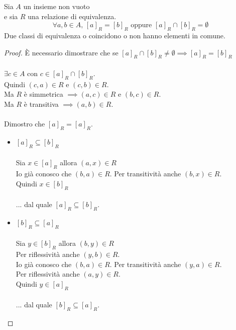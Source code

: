 \documentclass[a4paper,12pt, oneside]{book}
\begin{document}
\begin{teorema}
	Sia $A$ un insieme non vuoto\\
	e sia $R$ una relazione di equivalenza.
	$$\forall a,b \in A \mbox{, } [a]_{R} = [b]_{R} \mbox{ oppure } [a]_{R} \cap [b]_{R} = \emptyset$$
	Due classi  di equivalenza o coincidono o non hanno elementi in comune.
	\begin{proof}
		È necessario dimostrare che se $[a]_{R} \cap [b]_{R} \not = \emptyset \implies [a]_{R} = [b]_{R}$\\\\

		$\exists c \in A$ con $c \in [a]_{R} \cap [b]_{R}$.\\
		Quindi $(c,a) \in R$ e $(c,b) \in R$.\\
		Ma $R$ è simmetrica $\implies (a,c) \in R$ e $(b,c) \in R$.\\
		Ma $R$ è transitiva $\implies (a,b) \in R$.\\\\

		Dimostro che $[a]_{R} = [a]_{R}$.\\
		\begin{itemize}
			\item $[a]_{R} \subseteq [b]_{R}$\\\\
			      Sia $x \in [a]_{R}$ allora $(a,x) \in R$\\
			      Io già conosco che $(b,a) \in R$. Per transitività anche $(b,x) \in R$.\\
			      Quindi $x \in [b]_{R}$\\\\
			      ... dal quale $[a]_{R} \subseteq [b]_{R}$.
			\item $[b]_{R} \subseteq [a]_{R}$\\\\
			      Sia $y \in [b]_{R}$ allora $(b,y) \in R$\\
			      Per riflessività anche $(y,b) \in R$.\\
			      Io già conosco che $(b,a) \in R$. Per transitività anche $(y,a) \in R$.\\
			      Per riflessività anche $(a,y) \in R$.\\
			      Quindi $y \in [a]_{R}$\\\\
			      ... dal quale $[b]_{R} \subseteq [a]_{R}$.
		\end{itemize}
	\end{proof}
\end{teorema}
\end{document}
